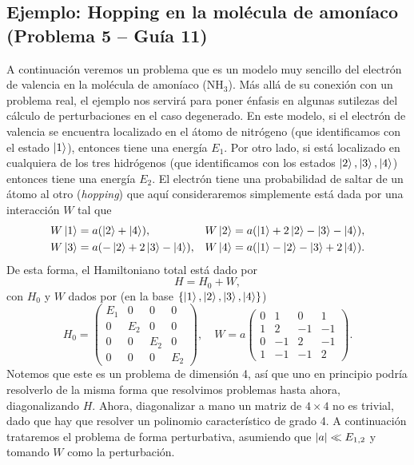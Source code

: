 \documentclass[10pt, a4paper]{article}
\numberwithin{equation}{subsection}
\begin{document}
\subsection{Ejemplo: Hopping en la molécula de amoníaco
  (Problema 5 -- Guía 11)}
A continuación veremos un problema que es un modelo muy sencillo del electrón
de valencia en la molécula de amoníaco ($\text{NH}_{3}$). Más allá de su
conexión con un problema real, el ejemplo nos servirá para poner énfasis en
algunas sutilezas del cálculo de perturbaciones en el caso degenerado. En este
modelo, si el electrón de valencia se encuentra localizado en el átomo de
nitrógeno (que identificamos con el estado $\ket{1}$), entonces tiene una
energía $E_1$. Por otro lado, si está localizado en cualquiera de los tres
hidrógenos (que identificamos con los estados $\ket{2}, \ket{3}, \ket{4}$)
entonces tiene una energía $E_2$. El electrón tiene una probabilidad de saltar
de un átomo al otro (\emph{hopping}) que aquí consideraremos simplemente está
dada por una interacción $W$ tal que
\begin{align}
  W\ket{1} &= a(\ket{2} + \ket{4}), &
  W\ket{2} &= a(\ket{1} + 2\ket{2} - \ket{3} - \ket{4}), \\
  W\ket{3} &= a(-\ket{2} + 2\ket{3} - \ket{4}), &
  W\ket{4} &= a(\ket{1} - \ket{2} - \ket{3} + 2\ket{4}).
\end{align}
De esta forma, el Hamiltoniano total está dado por
\begin{equation}
  H = H_0 + W,
\end{equation}
con $H_0$ y $W$ dados por (en la base $\set{\ket{1}, \ket{2}, \ket{3},
\ket{4}}$)
\begin{equation}
  H_0 = \begin{pmatrix}
    E_1 & 0 & 0 & 0 \\
    0 & E_2 & 0 & 0 \\
    0 & 0 & E_2 & 0 \\
    0 & 0 & 0 & E_2
  \end{pmatrix},
  \quad
  W = a\begin{pmatrix}
    0  &  1  &  0  &  1  \\
    1  &  2  & -1  & -1  \\
    0  & -1  &  2  & -1  \\
    1  & -1  & -1  &  2
  \end{pmatrix}. \label{eq:exc:hoppingWmat}
\end{equation}
Notemos que este es un problema de dimensión 4, así que uno en principio podría
resolverlo de la misma forma que resolvimos problemas hasta ahora,
diagonalizando $H$. Ahora, diagonalizar a mano un matriz de $4\times4$ no es
trivial, dado que hay que resolver un polinomio característico de grado 4. A
continuación trataremos el problema de forma perturbativa, asumiendo que
$\abs{a} \ll E_{1,2}$ y tomando $W$ como la perturbación.
\end{document}
